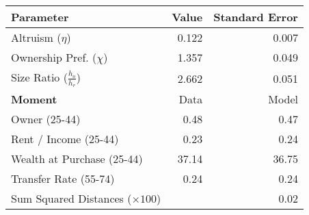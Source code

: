 \begin{tabular}{lrr}
\toprule   
 \textbf{Parameter} & Value & Standard Error\\
\midrule
Altruism ($\eta$) & 0.122 & 0.007\\
Ownership Pref. ($\chi$) & 1.357 & 0.049\\
Size Ratio ($\frac{h_o}{h_r}$) & 2.662 & 0.051\\
\cmidrule(lr){1-3} 

 
\textbf{Moment} & Data & Model\\
\midrule
Owner (25-44) & 0.48 & 0.47\\
Rent / Income (25-44) & 0.23 & 0.24\\
Wealth at Purchase (25-44) & 37.14 & 36.75\\
Transfer Rate (55-74) & 0.24 & 0.24\\
\midrule 
 Sum Squared Distances ($ \times 100$) &  & 0.02\\
\bottomrule
\end{tabular}
